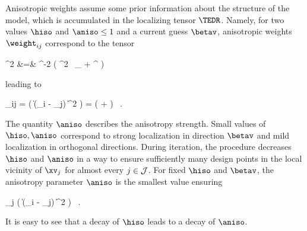 Anisotropic weights assume some prior information about the structure of the model, which is accumulated 
in the localizing tensor \( \TEDR \).
Namely, for two values \( \hiso \) and \( \aniso \leq 1 \) and a current guess \( \betav \), anisotropic weights \( \weight_{ij} \)
correspond to the tensor 
\begin{EQA}[rcl]
	\TEDR^{2}
	&=&
	\hiso^{-2} \bigl( \aniso^{2} \, \Id_{\dimd} + \betav \betav^{\T} \bigr)
\label{iufhvu8kjbmnll475edf}
\end{EQA}
leading to 
\begin{EQA}[c]
	\weight_{ij}
	=
	\Kern\bigl( \| \TEDR (\Xv_{i} - \xv_{j}) \|^{2} \bigr)
	=
	\Kern\bigl( 
		+  
	\bigr)
	\, .
\end{EQA}
The quantity \( \aniso \) describes the anisotropy strength.
Small values of \( \hiso, \aniso \) correspond to strong localization in direction \( \betav \)
and mild localization in orthogonal directions. 
During iteration, the procedure decreases \( \hiso \) and \( \aniso \) in a way 
to ensure sufficiently many design points in the local vicinity of \( \xv_{j} \) 
for almost every \( j \in \mathcal{J} \).
For fixed \( \hiso \) and \( \betav \), the anisotropy parameter \( \aniso \) is the smallest value ensuring
\begin{EQA}[c]
	 \sum_{j \in \JJJ} 
	\sumi \Kern\bigl( \| \TEDR (\Xv_{i} - \xv_{j}) \|^{2} \bigr)
	\geq 
	\nmin
	\, .
	\qquad
\label{jhgiverkytde4w34etycja}
\end{EQA}
It is easy to see that a decay of \( \hiso \) leads to a decay of \( \aniso \).

